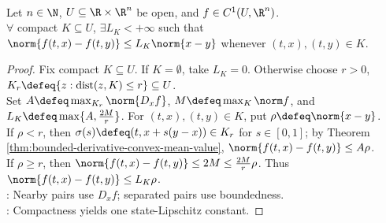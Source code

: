 \begin{lemma} \label{lem:c1-vector-field-locally-state-lipschitz} \\
Let $n\in\N$, $U\subseteq\R\times\R^n$ be open, and $f\in C^1(U,\R^n)$.\\
$\forall$ compact $K\subseteq U$, $\exists L_K<+\infty$ such that $\norm{f(t,x)-f(t,y)}\leq L_K\norm{x-y}$ whenever $(t,x),(t,y)\in K$.
\begin{proof}
Fix compact $K\subseteq U$. If $K=\emptyset$, take $L_K=0$. Otherwise choose $r>0$, $K_r\defeq\{z:\operatorname{dist}(z,K)\leq r\}\subseteq U$.\\
Set $A\defeq\max_{K_r}\norm{D_xf}$, $M\defeq\max_K\norm f$, and $L_K\defeq\max\{A,\frac{2M}{r}\}$. For $(t,x),(t,y)\in K$, put $\rho\defeq\norm{x-y}$.\\
If $\rho<r$, then $\sigma(s)\defeq(t,x+s(y-x))\in K_r$ for $s\in[0,1]$; by Theorem \ref{thm:bounded-derivative-convex-mean-value}, $\norm{f(t,x)-f(t,y)}\leq A\rho$.\\
If $\rho\geq r$, then $\norm{f(t,x)-f(t,y)}\leq2M\leq\frac{2M}{r}\rho$. Thus $\norm{f(t,x)-f(t,y)}\leq L_K\rho$.\\
: Nearby pairs use $D_xf$; separated pairs use boundedness.\\
: Compactness yields one state-Lipschitz constant.
\end{proof}
\end{lemma}


